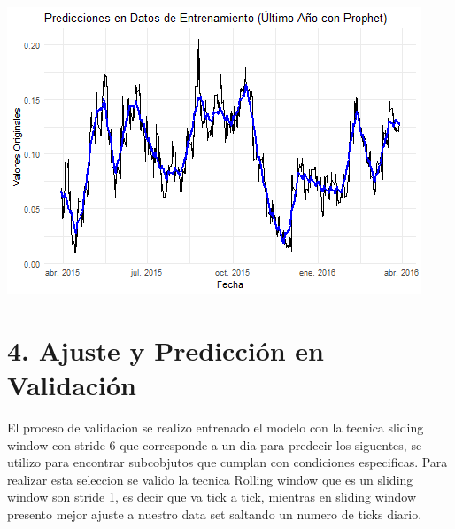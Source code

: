 \documentclass[
]{book}
\begin{document}
\includegraphics{bookdown_time_series_files/figure-latex/unnamed-chunk-13-1.png}

\section{4. Ajuste y Predicción en Validación}\label{ajuste-y-predicciuxf3n-en-validaciuxf3n}

El proceso de validacion se realizo entrenado el modelo con la tecnica sliding window con stride 6 que corresponde a un dia para predecir los siguentes, se utilizo para encontrar subcobjutos que cumplan con condiciones especificas. Para realizar esta seleccion se valido la tecnica Rolling window que es un sliding window son stride 1, es decir que va tick a tick, mientras en sliding window presento mejor ajuste a nuestro data set saltando un numero de ticks diario.
\end{document}
